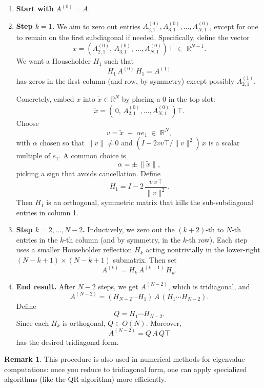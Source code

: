 \documentclass[letterpaper,11pt,oneside,reqno]{article}
\numberwithin{equation}{section}
\theoremstyle{definition}
\newtheorem{remark}[proposition]{Remark}
\begin{document}
\begin{enumerate}[1.]
\item \textbf{Start with } \(A^{(0)}=A\).
\item \textbf{Step \(k=1\).}
   We aim to zero out entries \(A^{(0)}_{2,1},A^{(0)}_{3,1},\ldots,A^{(0)}_{N,1}\), except for one to remain on the first subdiagonal if needed. Specifically, define the vector
   \[
     x
     = (A^{(0)}_{2,1},\,A^{(0)}_{3,1},\,\dots,A^{(0)}_{N,1})\top
     \;\in\;\mathbb{R}^{N-1}.
   \]
   We want a Householder \(H_1\) such that
   \[
     H_1\,A^{(0)}\,H_1
     = A^{(1)}
   \]
   has zeros in the first column (and row, by symmetry) except possibly \(A^{(1)}_{2,1}\).

   Concretely, embed \(x\) into \(\tilde x \in \mathbb{R}^N\) by placing a \(0\) in the top slot:
   \[
     \tilde x = (\,0,\, A^{(0)}_{2,1},\ldots,A^{(0)}_{N,1}\,)\top.
   \]
   Choose
   \[
     v = \tilde x \;+\;\alpha e_1
     \;\in\;\mathbb{R}^N,
   \]
   with \(\alpha\) chosen so that
   \(\|v\|\neq 0\) and \((I - 2vv\top/\|v\|^2)\,\tilde x\) is a scalar multiple of \(e_1\).  A common choice is
   \[
     \alpha = \pm\,\|\tilde x\|,
   \]
   picking a sign that avoids cancellation.  Define
   \[
     H_1 = I - 2 \,\frac{v\,v\top}{\|v\|^2}.
   \]
   Then \(H_1\) is an orthogonal, symmetric matrix that kills the sub-subdiagonal entries in column 1.
\item \textbf{Step \(k=2,\dots,N-2\).}
   Inductively, we zero out the \((k+2)\)-th to \(N\)-th entries in the \(k\)-th column (and by symmetry, in the \(k\)-th row).  Each step uses a smaller Householder reflection \(H_k\) acting nontrivially in the lower-right \((N-k+1)\times(N-k+1)\) submatrix.  Then set
   \[
     A^{(k)} = H_k\,A^{(k-1)}\,H_k.
   \]
\item \textbf{End result.}
   After \(N-2\) steps, we get \(A^{(N-2)}\), which is tridiagonal, and
   \[
     A^{(N-2)}
     = (H_{N-2}\cdots H_1)\,A\,(H_1\cdots H_{N-2}).
   \]
   Define
   \[
     Q = H_1 \cdots H_{N-2}.
   \]
   Since each \(H_k\) is orthogonal, \(Q\in O(N)\). Moreover,
   \[
     A^{(N-2)} = Q\,A\,Q\top
   \]
   has the desired tridiagonal form.
\end{enumerate}

\begin{remark}
This procedure is also used in numerical methods for eigenvalue computations: once you reduce to tridiagonal form, one can apply specialized algorithms (like the QR algorithm) more efficiently.
\end{remark}
\end{document}
